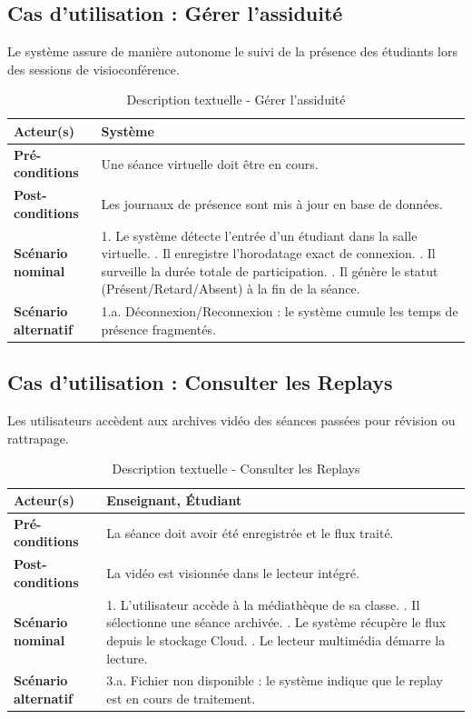 \subsection{Cas d'utilisation : Gérer l'assiduité}
Le système assure de manière autonome le suivi de la présence des étudiants lors des sessions de visioconférence.

\begin{table}[H]
\centering
\small
\begin{tabularx}{\textwidth}{|l|X|}
\hline
\rowcolor[HTML]{EFEFEF} 
\textbf{Acteur(s)} & Système \\ \hline
\textbf{Pré-conditions} & Une séance virtuelle doit être en cours. \\ \hline
\textbf{Post-conditions} & Les journaux de présence sont mis à jour en base de données. \\ \hline
\textbf{Scénario nominal} & 
1. Le système détecte l'entrée d'un étudiant dans la salle virtuelle. \newline
2. Il enregistre l'horodatage exact de connexion. \newline
3. Il surveille la durée totale de participation. \newline
4. Il génère le statut (Présent/Retard/Absent) à la fin de la séance. \\ \hline
\textbf{Scénario alternatif} & 
1.a. Déconnexion/Reconnexion : le système cumule les temps de présence fragmentés. \\ \hline
\end{tabularx}
\caption{Description textuelle - Gérer l'assiduité}
\end{table}

\subsection{Cas d'utilisation : Consulter les Replays}
Les utilisateurs accèdent aux archives vidéo des séances passées pour révision ou rattrapage.

\begin{table}[H]
\centering
\small
\begin{tabularx}{\textwidth}{|l|X|}
\hline
\rowcolor[HTML]{EFEFEF} 
\textbf{Acteur(s)} & Enseignant, Étudiant \\ \hline
\textbf{Pré-conditions} & La séance doit avoir été enregistrée et le flux traité. \\ \hline
\textbf{Post-conditions} & La vidéo est visionnée dans le lecteur intégré. \\ \hline
\textbf{Scénario nominal} & 
1. L'utilisateur accède à la médiathèque de sa classe. \newline
2. Il sélectionne une séance archivée. \newline
3. Le système récupère le flux depuis le stockage Cloud. \newline
4. Le lecteur multimédia démarre la lecture. \\ \hline
\textbf{Scénario alternatif} & 
3.a. Fichier non disponible : le système indique que le replay est en cours de traitement. \\ \hline
\end{tabularx}
\caption{Description textuelle - Consulter les Replays}
\end{table}

